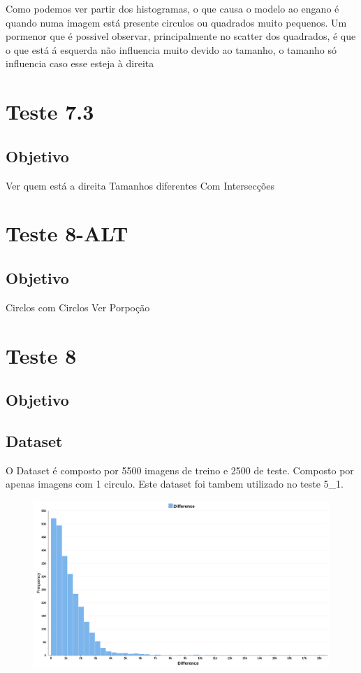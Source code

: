 Como podemos ver partir dos histogramas, o que causa o modelo ao engano é quando numa imagem está presente circulos ou quadrados muito pequenos. Um pormenor que é possivel observar, principalmente no scatter dos quadrados, é que o que está á esquerda não influencia muito devido ao tamanho, o tamanho só influencia caso esse esteja à direita


\section{Teste 7.3}
\subsection{Objetivo}
    Ver quem está a direita
    Tamanhos diferentes
    Com Intersecções


\section{Teste 8-ALT}
\subsection{Objetivo}
       Circlos com Circlos
       Ver Porpoção
    
    

\section{Teste 8}
\subsection{Objetivo}

\subsection{Dataset}
    O Dataset é composto por 5500 imagens de treino e 2500 de teste. Composto por apenas imagens com 1 circulo.
    Este dataset foi tambem utilizado no teste 5_1.
    
   
        \begin{figure}[H]
        \centering
        \includegraphics[width=1.0\linewidth]{imgs/Test_8/area_diference_hist.png}

        \label{fig:enter-label}
    \end{figure}
    
